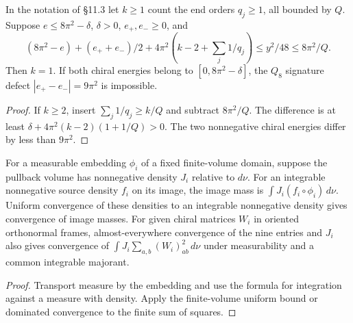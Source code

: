 \begin{lemma}
\label{lem:scalar-ale-end-count}
\leanok
In the notation of \S11.3 let $k\ge1$ count the end orders $q_j\ge1$,
all bounded by $Q$. Suppose $e\le8\pi^2-\delta$, $\delta>0$,
$e_+,e_-\ge0$, and
\[
 (8\pi^2-e)+(e_++e_-)/2+4\pi^2(k-2+\textstyle\sum_j1/q_j)
 \le y^2/48\le 8\pi^2/Q.
\]
Then $k=1$. If both chiral energies belong to $[0,8\pi^2-\delta]$,
the $Q_8$ signature defect $|e_+-e_-|=9\pi^2$ is impossible.
\end{lemma}
\begin{proof}
\leanok
If $k\ge2$, insert $\sum_j1/q_j\ge k/Q$ and subtract $8\pi^2/Q$.
The difference is at least $\delta+4\pi^2(k-2)(1+1/Q)>0$.
The two nonnegative chiral energies differ by less than $9\pi^2$.
\end{proof}

\begin{lemma}
\label{lem:fixed-domain-density}
\leanok
For a measurable embedding $\phi_i$ of a fixed finite-volume domain,
suppose the pullback volume has nonnegative density $J_i$ relative to
$d\nu$. For an integrable nonnegative source density $f_i$ on its image,
the image mass is $\int J_i(f_i\circ\phi_i)\,d\nu$.
Uniform convergence of these densities to an integrable nonnegative
density gives convergence of image masses. For given chiral matrices
$W_i$ in oriented orthonormal frames, almost-everywhere convergence of
the nine entries and $J_i$ also gives convergence of
$\int J_i\sum_{a,b}(W_i)_{ab}^2\,d\nu$ under measurability and a common
integrable majorant.
\end{lemma}
\begin{proof}
\leanok
Transport measure by the embedding and use the formula for integration
against a measure with density. Apply the finite-volume uniform bound
or dominated convergence to the finite sum of squares.
\end{proof}

